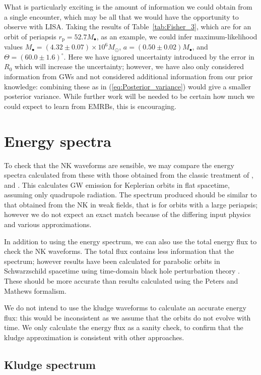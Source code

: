 \documentclass[useAMS,usedcolumn,usegraphicx,usenatbib]{mn2e}
\newcommand{\eqnref}[1]{(\ref{eq:#1})}
\newcommand{\tabref}[1]{Table~\ref{tab:#1}}
\newcommand{\sub}[1]{\ensuremath{_\mathrm{#1}}}
\begin{document}
What is particularly exciting is the amount of information we could obtain from a single encounter, which may be all that we would have the opportunity to observe with LISA. Taking the results of \tabref{Fisher_3}, which are for an orbit of periapsis $r\sub{p} = 52.7 M_\bullet$, as an example, we could infer maximum-likelihood values $M_\bullet = (4.32 \pm 0.07) \times 10^6 M_\odot$, $a = (0.50{} \pm {}0.02) M_\bullet$, and $\Theta = {(60.0 \pm 1.6)^{\circ}}$. Here we have ignored uncertainty introduced by the error in $R_0$ which will increase the uncertainty; however, we have also only considered information from GWs and not considered additional information from our prior knowledge: combining these as in \eqnref{Posterior_variance} would give a smaller posterior variance. While further work will be needed to be certain how much we could expect to learn from EMRBs, this is encouraging.

\section{Energy spectra}\label{sec:Energy}

To check that the NK waveforms are sensible, we may compare the energy spectra calculated from these with those obtained from the classic treatment of \citet{Peters1963}, and \citet{Peters1964}. This calculates GW emission for Keplerian orbits in flat spacetime, assuming only quadrupole radiation. The spectrum produced should be similar to that obtained from the NK in weak fields, that is for orbits with a large periapsis; however we do not expect an exact match because of the differing input physics and various approximations.

In addition to using the energy spectrum, we can also use the total energy flux to check the NK waveforms. The total flux contains less information that the spectrum; however results have been calculated for parabolic orbits in Schwarzschild spacetime using time-domain black hole perturbation theory \citep{Martel2004}. These should be more accurate than results calculated using the Peters and Mathews formalism.

We do not intend to use the kludge waveforms to calculate an accurate energy flux: this would be inconsistent as we assume that the orbits do not evolve with time. We only calculate the energy flux as a sanity check, to confirm that the kludge approximation is consistent with other approaches.

\subsection{Kludge spectrum}
\end{document}
